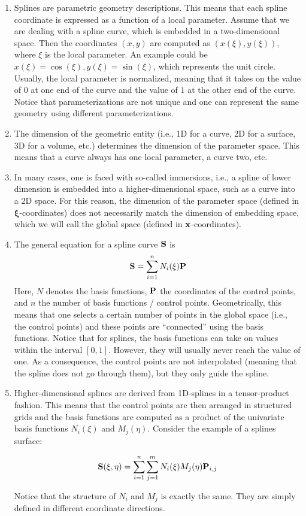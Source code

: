 \documentclass[11pt,a4paper]{article}
\begin{document}
\begin{enumerate}
\item Splines are parametric geometry descriptions. This means that each spline coordinate is expressed as a function of a local parameter. Assume that we are dealing with a spline curve, which is embedded in a two-dimensional space. Then the coordinates $(x,y)$ are computed as $(x(\xi), y(\xi))$, where $\xi$ is the local parameter. An example could be $x(\xi) = \cos(\xi), y(\xi) = \sin(\xi)$, which represents the unit circle. Usually, the local parameter is normalized, meaning that it takes on the value of $0$ at one end of the curve and the value of $1$ at the other end of the curve. Notice that parameterizations are not unique and one can represent the same geometry using different parameterizations.
\item The dimension of the geometric entity (i.e., 1D for a curve, 2D for a surface, 3D for a volume, etc.) determines the dimension of the parameter space. This means that a curve always has one local parameter, a curve two, etc.
\item In many cases, one is faced with so-called immersions, i.e., a spline of lower dimension is embedded into a higher-dimensional space, such as a curve into a 2D space. For this reason, the dimension of the parameter space (defined in $\boldsymbol{\xi}$-coordinates) does not necessarily match the dimension of embedding space, which we will call the global space (defined in ${\bf x}$-coordinates).
\item The general equation for a spline curve $\bf S$ is
\begin{equation}
    {\bf S} = \sum_{i=1}^n N_i(\xi) {\bf P}
\end{equation}
Here, $N$ denotes the basis functions, $\bf P$ the coordinates of the control points, and $n$ the number of basis functions / control points. Geometrically, this means that one selects a certain number of points in the global space (i.e., the control points) and these points are ``connected'' using the basis functions. Notice that for splines, the basis functions can take on values within the interval $[0,1]$. However, they will usually never reach the value of one. As a consequence, the control points are not interpolated (meaning that the spline does not go through them), but they only guide the spline.
\item Higher-dimensional splines are derived from 1D-splines in a tensor-product fashion. This means that the control points are then arranged in structured grids and the basis functions are computed as a product of the univariate basis functions $N_i(\xi)$ and $M_j(\eta)$. Consider the example of a splines surface:

\begin{equation}
    {\bf S}(\xi, \eta) = \sum_{i=1}^n \sum_{j=1}^m N_i(\xi) M_j(\eta) {\bf P}_{i,j}
\end{equation}

Notice that the structure of $N_i$ and $M_j$ is exactly the same. They are simply defined in different coordinate directions.
\end{enumerate}
\end{document}
